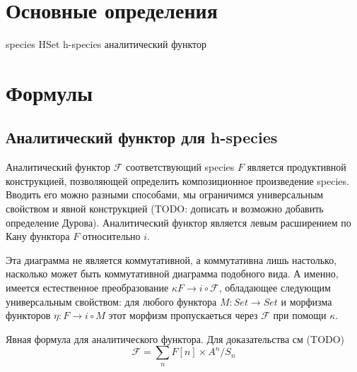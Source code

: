 \section{Основные определения}

species
HSet
h-species
аналитический функтор

\section{Формулы}

\subsection{Аналитический функтор для h-species}
Аналитический функтор $\mathcal F$ соответствующий species $F$ является
продуктивной конструкцией, позволяющей определить композиционное произведение
species. Вводить его можно разными способами, мы ограничимся универсальным
свойством и явной конструкцией (TODO: дописать и возможно добавить определение
Дурова). Аналитический функтор является левым расширением по Кану функтора $F$
относительно $i$.


Эта диаграмма не является коммутативной, а коммутативна лишь настолько, насколько может быть коммутативной диаграмма
подобного вида. А именно, имеется  естественное преобразование  $\kappa F\rightarrow i \circ \mathcal F$,
обладающее следующим универсальным свойством:
 для любого функтора $M \colon
Set \rightarrow Set$ и морфизма функторов $\eta \colon F \rightarrow i \circ M$
этот морфизм пропускаеться через $\mathcal F$ при помощи $\kappa$.



Явная формула для аналитического функтора. Для доказательства см (TODO)
\begin{equation}
\label{eq:an}
	\mathcal F = \sum\limits_n F[n] \times A^n / S_n
\end{equation}

